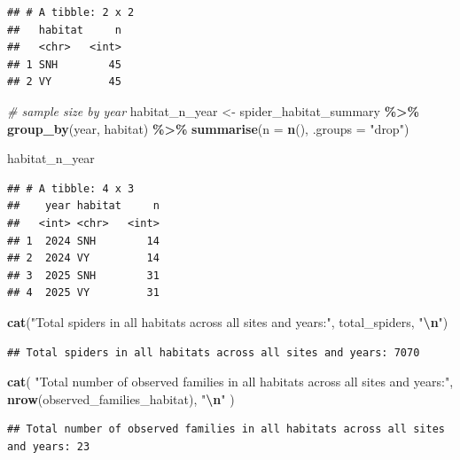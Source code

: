 \documentclass[
]{article}
\newenvironment{Shaded}{\begin{snugshade}}{\end{snugshade}}
\newcommand{\AttributeTok}[1]{\textcolor[rgb]{0.13,0.29,0.53}{#1}}
\newcommand{\CommentTok}[1]{\textcolor[rgb]{0.56,0.35,0.01}{\textit{#1}}}
\newcommand{\FunctionTok}[1]{\textcolor[rgb]{0.13,0.29,0.53}{\textbf{#1}}}
\newcommand{\NormalTok}[1]{#1}
\newcommand{\OtherTok}[1]{\textcolor[rgb]{0.56,0.35,0.01}{#1}}
\newcommand{\SpecialCharTok}[1]{\textcolor[rgb]{0.81,0.36,0.00}{\textbf{#1}}}
\newcommand{\StringTok}[1]{\textcolor[rgb]{0.31,0.60,0.02}{#1}}
\begin{document}
\begin{verbatim}
## # A tibble: 2 x 2
##   habitat     n
##   <chr>   <int>
## 1 SNH        45
## 2 VY         45
\end{verbatim}

\begin{Shaded}
\begin{Highlighting}[]
\CommentTok{\# sample size by year}
\NormalTok{habitat\_n\_year }\OtherTok{\textless{}{-}}\NormalTok{ spider\_habitat\_summary }\SpecialCharTok{\%\textgreater{}\%}
  \FunctionTok{group\_by}\NormalTok{(year, habitat) }\SpecialCharTok{\%\textgreater{}\%}
  \FunctionTok{summarise}\NormalTok{(}\AttributeTok{n =} \FunctionTok{n}\NormalTok{(), }\AttributeTok{.groups =} \StringTok{"drop"}\NormalTok{)}

\NormalTok{habitat\_n\_year}
\end{Highlighting}
\end{Shaded}

\begin{verbatim}
## # A tibble: 4 x 3
##    year habitat     n
##   <int> <chr>   <int>
## 1  2024 SNH        14
## 2  2024 VY         14
## 3  2025 SNH        31
## 4  2025 VY         31
\end{verbatim}

\begin{Shaded}
\begin{Highlighting}[]
\FunctionTok{cat}\NormalTok{(}\StringTok{"Total spiders in all habitats across all sites and years:"}\NormalTok{, total\_spiders, }\StringTok{"}\SpecialCharTok{\textbackslash{}n}\StringTok{"}\NormalTok{)}
\end{Highlighting}
\end{Shaded}

\begin{verbatim}
## Total spiders in all habitats across all sites and years: 7070
\end{verbatim}

\begin{Shaded}
\begin{Highlighting}[]
\FunctionTok{cat}\NormalTok{(}
  \StringTok{"Total number of observed families in all habitats across all sites and years:"}\NormalTok{,}
  \FunctionTok{nrow}\NormalTok{(observed\_families\_habitat),}
  \StringTok{"}\SpecialCharTok{\textbackslash{}n}\StringTok{"}
\NormalTok{)}
\end{Highlighting}
\end{Shaded}

\begin{verbatim}
## Total number of observed families in all habitats across all sites and years: 23
\end{verbatim}
\end{document}
